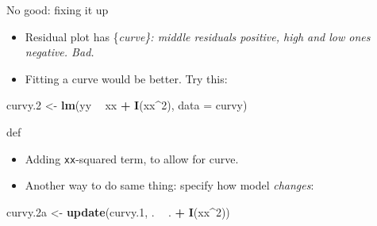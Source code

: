 \documentclass[ignorenonframetext,]{beamer}
\newenvironment{Shaded}{\begin{snugshade}}{\end{snugshade}}
\newcommand{\DataTypeTok}[1]{\textcolor[rgb]{0.13,0.29,0.53}{#1}}
\newcommand{\DecValTok}[1]{\textcolor[rgb]{0.00,0.00,0.81}{#1}}
\newcommand{\FloatTok}[1]{\textcolor[rgb]{0.00,0.00,0.81}{#1}}
\newcommand{\KeywordTok}[1]{\textcolor[rgb]{0.13,0.29,0.53}{\textbf{#1}}}
\newcommand{\NormalTok}[1]{#1}
\newcommand{\OperatorTok}[1]{\textcolor[rgb]{0.81,0.36,0.00}{\textbf{#1}}}
\newcommand{\StringTok}[1]{\textcolor[rgb]{0.31,0.60,0.02}{#1}}
\begin{document}
\begin{frame}[fragile]{No good: fixing it up}
\protect\hypertarget{no-good-fixing-it-up}{}

\begin{itemize}
\item
  Residual plot has \{\em curve\}: middle residuals positive, high and
  low ones negative. Bad.
\item
  Fitting a curve would be better. Try this:
\end{itemize}

\begin{Shaded}
\begin{Highlighting}[]
\NormalTok{curvy}\FloatTok{.2}\NormalTok{ <-}\StringTok{ }\KeywordTok{lm}\NormalTok{(yy }\OperatorTok{~}\StringTok{ }\NormalTok{xx }\OperatorTok{+}\StringTok{ }\KeywordTok{I}\NormalTok{(xx}\OperatorTok{^}\DecValTok{2}\NormalTok{), }\DataTypeTok{data =}\NormalTok{ curvy)}
\end{Highlighting}
\end{Shaded}

def

\begin{itemize}
\item
  Adding \texttt{xx}-squared term, to allow for curve.
\item
  Another way to do same thing: specify how model \emph{changes}:
\end{itemize}

\begin{Shaded}
\begin{Highlighting}[]
\NormalTok{curvy}\FloatTok{.2}\NormalTok{a <-}\StringTok{ }\KeywordTok{update}\NormalTok{(curvy}\FloatTok{.1}\NormalTok{, . }\OperatorTok{~}\StringTok{ }\NormalTok{. }\OperatorTok{+}\StringTok{ }\KeywordTok{I}\NormalTok{(xx}\OperatorTok{^}\DecValTok{2}\NormalTok{))}
\end{Highlighting}
\end{Shaded}

\end{frame}
\end{document}
